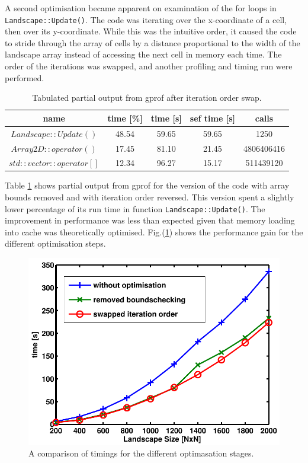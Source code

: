 A second optimisation became apparent on examination of the for loops in \texttt{Landscape::Update()}.
The code was iterating over the x-coordinate of a cell, then over its y-coordinate.
While this was the intuitive order, it caused the code to stride through the array of cells by a distance proportional to the width of the landscape array instead of accessing the next cell in memory each time.
The order of the iterations was swapped, and another profiling and timing run were performed.

\begin{table}[h!]
\caption{Tabulated partial output from gprof after iteration order swap.}
\label{tab: profile 3}
 \begin{center}
\begin{tabular}{|c|c|c|c|c|}
\hline
name & time [\%] & time [s] & sef time [s] & calls\\
\hline
$Landscape::Update()$ & 48.54 & 59.65 & 59.65 &1250 \\
\hline
$Array2D::operator()$& 17.45& 81.10& 21.45 &4806406416 \\
\hline
$std::vector::operator[]$& 12.34& 96.27 &15.17 &511439120\\
\hline
\end{tabular}
\end{center}
\end{table}

Table \ref{tab: profile 3} shows partial output from gprof for the version of the code with array bounds removed and with iteration order reversed.
This version spent a slightly lower percentage of its run time in function \texttt{Landscape::Update()}.
The improvement in performance was less than expected given that memory loading into cache was theoretically optimised. Fig.(\ref{fig:Optimisation}) shows the performance gain for the different optimisation steps.

\begin{figure}
\begin{center}
  \includegraphics[scale=0.7]{Figures/TimingsOptimisation.pdf}
\caption{A comparison of timings for the different optimasation stages.}
\label{fig:Optimisation}
\end{center}
\end{figure}


